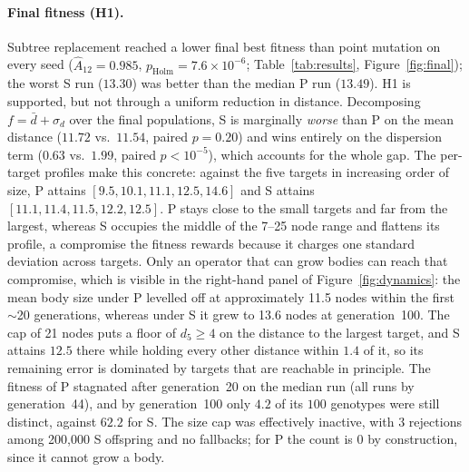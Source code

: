 \documentclass[sigconf]{acmart}
\begin{document}
\paragraph{Final fitness (H1).}
Subtree replacement reached a lower final best fitness than point mutation on every seed ($\hat{A}_{12} = 0.985$, $p_\text{Holm} = 7.6\times10^{-6}$; Table~\ref{tab:results}, Figure~\ref{fig:final}); the worst S run ($13.30$) was better than the median P run ($13.49$).
H1 is supported, but not through a uniform reduction in distance.
Decomposing $f = \bar{d} + \sigma_d$ over the final populations, S is marginally \emph{worse} than P on the mean distance ($11.72$ vs.\ $11.54$, paired $p = 0.20$) and wins entirely on the dispersion term ($0.63$ vs.\ $1.99$, paired $p < 10^{-5}$), which accounts for the whole gap.
The per-target profiles make this concrete: against the five targets in increasing order of size, P attains $[9.5, 10.1, 11.1, 12.5, 14.6]$ and S attains $[11.1, 11.4, 11.5, 12.2, 12.5]$.
P stays close to the small targets and far from the largest, whereas S occupies the middle of the 7--25 node range and flattens its profile, a compromise the fitness rewards because it charges one standard deviation across targets.
Only an operator that can grow bodies can reach that compromise, which is visible in the right-hand panel of Figure~\ref{fig:dynamics}: the mean body size under P levelled off at approximately 11.5 nodes within the first $\sim$20 generations, whereas under S it grew to 13.6 nodes at generation~100.
The cap of 21 nodes puts a floor of $d_5 \geq 4$ on the distance to the largest target, and S attains $12.5$ there while holding every other distance within $1.4$ of it, so its remaining error is dominated by targets that are reachable in principle.
The fitness of P stagnated after generation~20 on the median run (all runs by generation~44), and by generation~100 only $4.2$ of its $100$ genotypes were still distinct, against $62.2$ for S.
The size cap was effectively inactive, with 3 rejections among 200{,}000 S offspring and no fallbacks; for P the count is 0 by construction, since it cannot grow a body.
\end{document}
